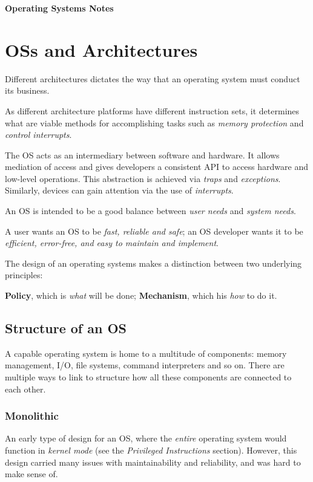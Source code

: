 \documentclass[a4]{article}
\begin{document}
\textbf{\Huge Operating Systems Notes}

\section{OSs and Architectures}

Different architectures dictates the way that an operating system must conduct its business.

As different architecture platforms have different instruction sets, it determines what are viable methods for accomplishing tasks such as \textit{memory protection} and \textit{control interrupts}.

The OS acts as an intermediary between software and hardware. It allows mediation of access and gives developers a consistent API to access hardware and low-level operations. This abstraction is achieved via \textit{traps} and \textit{exceptions}. Similarly, devices can gain attention via the use of \textit{interrupts}.

An OS is intended to be a good balance between \textit{user needs} and \textit{system needs}.

A user wants an OS to be \textit{fast, reliable and safe}; an OS developer wants it to be \textit{efficient, error-free, and easy to maintain and implement}.

The design of an operating systems makes a distinction between two underlying principles:

\textbf{Policy}, which is \textit{what} will be done; \textbf{Mechanism}, which his \textit{how} to do it.

\subsection{Structure of an OS}

A capable operating system is home to a multitude of components: memory management, I/O, file systems, command interpreters and so on. There are multiple ways to link to structure how all these components are connected to each other.

\subsubsection{Monolithic}

An early type of design for an OS, where the \textit{entire} operating system would function in \textit{kernel mode} (see the \textit{Privileged Instructions} section). However, this design carried many issues with maintainability and reliability, and was hard to make sense of.
\end{document}
